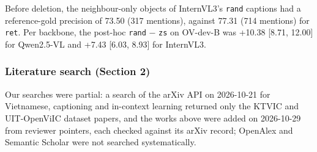 Before deletion, the neighbour-only objects of InternVL3's \texttt{rand} captions had a
reference-gold precision of 73.50 (317 mentions), against 77.31 (714 mentions) for \texttt{ret}. Per
backbone, the post-hoc \texttt{rand} − \texttt{zs} on OV-dev-B was +10.38 {[}8.71, 12.00{]} for
Qwen2.5-VL and +7.43 {[}6.03, 8.93{]} for InternVL3.

\subsubsection{Literature search (Section 2)}\label{literature-search-section-2}

Our searches were partial: a search of the arXiv API on 2026-10-21 for Vietnamese, captioning and
in-context learning returned only the KTVIC and UIT-OpenViIC dataset papers, and the works above
were added on 2026-10-29 from reviewer pointers, each checked against its arXiv record; OpenAlex and
Semantic Scholar were not searched systematically.
